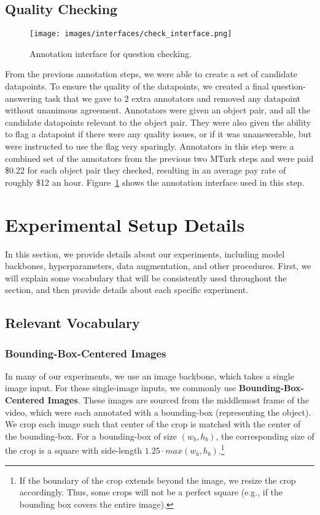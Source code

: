 \documentclass[runningheads]{llncs}
\begin{document}
\subsection{Quality Checking}

\begin{figure}[t]
    \centering
  \texttt{[image: images/interfaces/check\_interface.png]}
  \caption{Annotation interface for question checking.}
  \label{fig:check_interface}
\end{figure}

From the previous annotation steps, we were able to create a set of candidate datapoints. To ensure the quality of the datapoints, we created a final question-answering task that we gave to 2 extra annotators and removed any datapoint without unanimous agreement. Annotators were given an object pair, and all the candidate datapoints relevant to the object pair. They were also given the ability to flag a datapoint if there were any quality issues, or if it was unanswerable, but were instructed to use the flag very sparingly. Annotators in this step were a combined set of the annotators from the previous two MTurk steps and were paid \$0.22 for each object pair they checked, resulting in an average pay rate of roughly \$12 an hour. Figure~\ref{fig:check_interface} shows the annotation interface used in this step. 



\section{Experimental Setup Details}\label{appendix:experimental}

In this section, we provide details about our experiments, including model backbones, hyperparameters, data augmentation, and other procedures. First, we will explain some vocabulary that will be consistently used throughout the section, and then provide details about each specific experiment. 

\subsection{Relevant Vocabulary}

\subsubsection{Bounding-Box-Centered Images} In many of our experiments, we use an image backbone, which takes a single image input. For these single-image inputs, we commonly use \textbf{Bounding-Box-Centered Images}. These images are sourced from the middlemost frame of the video, which were each annotated with a bounding-box (representing the object). We crop each image such that center of the crop is matched with the center of the bounding-box. For a bounding-box of size $(w_b, h_b)$, the corresponding size of the crop is a square with side-length $1.25 \cdot max(w_b, h_b)$.\footnote{If the boundary of the crop extends beyond the image, we resize the crop accordingly. Thus, some crops will not be a perfect square (e.g., if the bounding box covers the entire image).}
\end{document}
